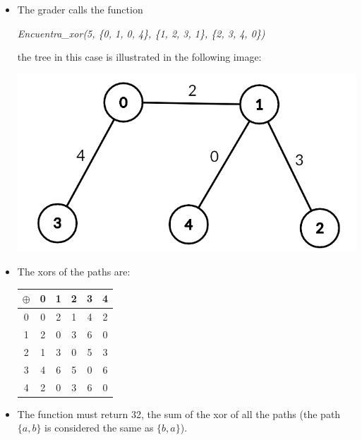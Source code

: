 \documentclass[12pt]{scrartcl}
\begin{document}
        \begin{itemize}
            \item  The grader calls the function 
            \begin{center}
                \textit{Encuentra\_xor(5, \{0, 1, 0, 4\}, \{1, 2, 3, 1\}, \{2, 3, 4, 0\})}
            \end{center}
            the tree in this case is illustrated in the following image:
            
            \begin{center}
                \includegraphics[scale=0.3]{ej1.png}
            \end{center}
            
            \item The xors of the paths are:

                \begin{center}
                    
                \begin{tabular}{|c||c|c|c|c|c|}
                     \hline
                      $\oplus$ & 0 & 1 & 2 & 3 & 4  \\
                     \hline
                     \hline 
                     0 & 0 & 2 & 1 & 4 & 2 \\
                     \hline 
                     1 & 2 & 0 & 3 & 6 & 0 \\ 
                     \hline
                     2 & 1 & 3 & 0 & 5 & 3 \\
                     \hline
                     3 & 4 & 6 & 5 & 0 & 6 \\
                     \hline
                     4 & 2 & 0 & 3 & 6 & 0 \\
                     \hline
                \end{tabular}
                
                \end{center}
            \item  The function must return 32, the sum of the xor of all the paths (the path $\{a, b\}$ is considered the same as $\{b, a\}$).
                
        \end{itemize}
\end{document}
